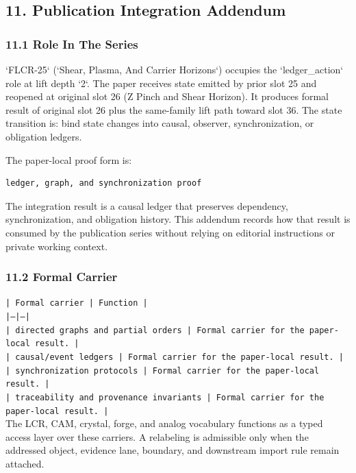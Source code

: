 \documentclass[11pt]{article}
\begin{document}
\subsection*{11. Publication Integration Addendum}

\subsubsection*{11.1 Role In The Series}

`FLCR-25` (`Shear, Plasma, And Carrier Horizons`) occupies the `ledger\_action` role at lift depth `2`.
The paper receives state emitted by prior slot 25 and reopened at original slot 26 (Z Pinch and Shear Horizon). It produces formal result of original slot 26 plus the same-family lift path toward slot 36. The state transition is:
bind state changes into causal, observer, synchronization, or obligation ledgers.

The paper-local proof form is:

\begin{verbatim}
ledger, graph, and synchronization proof
\end{verbatim}

The integration result is a causal ledger that preserves dependency, synchronization, and obligation history. This addendum records how that result is
consumed by the publication series without relying on editorial instructions or
private working context.

\subsubsection*{11.2 Formal Carrier}

\noindent\texttt{| Formal carrier | Function |}\\
\noindent\texttt{|---|---|}\\
\noindent\texttt{| directed graphs and partial orders | Formal carrier for the paper-local result. |}\\
\noindent\texttt{| causal/event ledgers | Formal carrier for the paper-local result. |}\\
\noindent\texttt{| synchronization protocols | Formal carrier for the paper-local result. |}\\
\noindent\texttt{| traceability and provenance invariants | Formal carrier for the paper-local result. |}\\

The LCR, CAM, crystal, forge, and analog vocabulary functions as a typed access
layer over these carriers. A relabeling is admissible only when the addressed
object, evidence lane, boundary, and downstream import rule remain attached.
\end{document}
